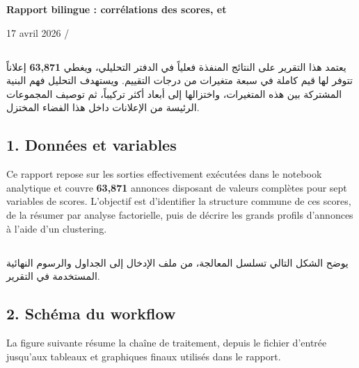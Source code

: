 \documentclass[11pt,a4paper]{article}
\begin{document}
\begin{center}
{\LARGE\bfseries \arabicfont{}}\par
\vspace{0.35em}
{\Large\bfseries Rapport bilingue : corrélations des scores,  et }\par
\vspace{0.5em}
{\small 17 avril 2026 / \arabicfont{}}\par
\end{center}

\begin{RTL}
\section*{{\arabicfont{}}}
يعتمد هذا التقرير على النتائج المنفذة فعلياً في الدفتر التحليلي، ويغطي \textbf{63{,}871} إعلاناً تتوفر لها قيم كاملة في سبعة متغيرات من درجات التقييم. ويستهدف التحليل فهم البنية المشتركة بين هذه المتغيرات، واختزالها إلى أبعاد أكثر تركيباً، ثم توصيف المجموعات الرئيسة من الإعلانات داخل هذا الفضاء المختزل.
\end{RTL}

\begin{LTR}
\section*{1. Donn\'ees et variables}
Ce rapport repose sur les sorties effectivement ex\'ecut\'ees dans le notebook analytique et couvre \textbf{63,871} annonces disposant de valeurs compl\`etes pour sept variables de scores. L'objectif est d'identifier la structure commune de ces scores, de la r\'esumer par analyse factorielle, puis de d\'ecrire les grands profils d'annonces \`a l'aide d'un clustering.
\end{LTR}

\begin{RTL}
\section*{{\arabicfont{}}}
يوضح الشكل التالي تسلسل المعالجة، من ملف الإدخال إلى الجداول والرسوم النهائية المستخدمة في التقرير.
\end{RTL}

\begin{LTR}
\section*{2. Sch\'ema du workflow}
La figure suivante r\'esume la cha\^ine de traitement, depuis le fichier d'entr\'ee jusqu'aux tableaux et graphiques finaux utilis\'es dans le rapport.
\end{LTR}
\end{document}
